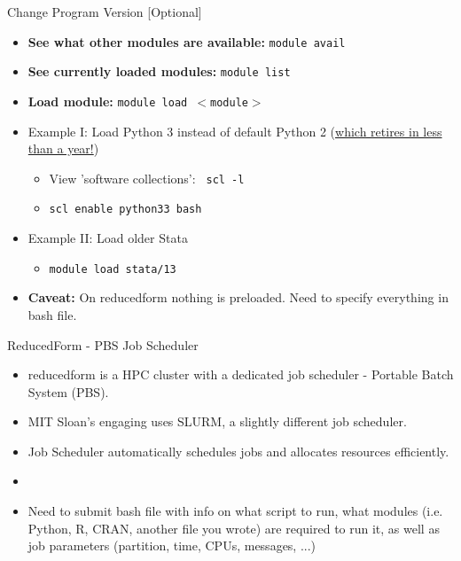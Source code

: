 \documentclass{beamer}
\begin{document}
\begin{frame}{Change Program Version [Optional]}
    \begin{itemize}
        \item \textbf{See what other modules are available:}  \texttt{module avail}
        \item \textbf{See currently loaded modules:} \texttt{module list}
        \item \textbf{Load module:} \texttt{module load $<$module$>$}
        \item Example I: Load Python 3 instead of default Python 2 (\href{https://pythonclock.org/}{which retires in less than a year!})
        \begin{itemize}
            \item View 'software collections': \texttt{ scl -l}
            \item \texttt{scl enable python33 bash} 
        \end{itemize}
        \item Example II: Load older Stata
        \begin{itemize}
            \item \texttt{module load stata/13}
        \end{itemize}
        \item \textbf{Caveat:} On reducedform nothing is preloaded. Need to specify everything in bash file.
    \end{itemize}
\end{frame}

\begin{frame}{ReducedForm - PBS Job Scheduler}
    \begin{itemize}
        \item reducedform is a HPC cluster with a dedicated job scheduler - Portable Batch System (PBS).
        \item MIT Sloan's engaging uses SLURM, a slightly different job scheduler.
        \item Job Scheduler automatically schedules jobs and allocates resources efficiently.
        \item[]
        \item Need to submit bash file with info on what script to run, what modules (i.e. Python, R, CRAN, another file you wrote) are required to run it, as well as job parameters (partition, time, CPUs, messages, ...)
    \end{itemize}
\end{frame}
\end{document}

